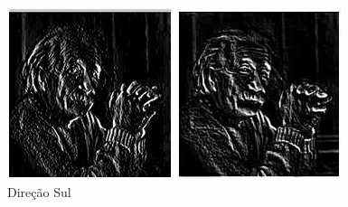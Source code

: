 \documentclass[a4paper, 12pt]{article}
\begin{document}
\begin{figure}[!htb]
	\centering
	  	\includegraphics[width=\linewidth]{images/robinson5.jpg}
	  	\caption{Direção Sul}
	\endminipage\hspace{1cm}
	 	\includegraphics[width=\linewidth]{images/robinson6.jpg}

\end{figure}
\end{document}
